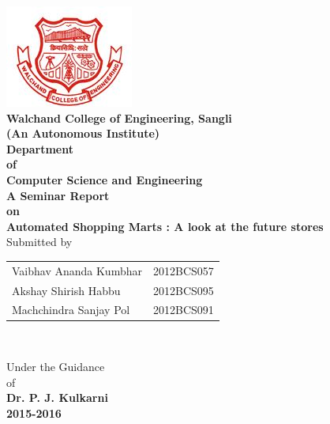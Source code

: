 \documentclass[a4paper,oneside,11pt,english]{report}
\begin{document}


\begin{titlepage}
	{
		\begin{center}
			\includegraphics[width=.2\linewidth]{logo/walchand.jpg}\\[.5cm]
			\textbf{\LARGE Walchand College of Engineering, Sangli }\\
			\textbf {(An Autonomous Institute)}\\[.5cm]
			\textbf {\Large Department\\ of\\ Computer Science and Engineering}\\[1.5cm]
			{ \large \textbf{ A  Seminar Report\\ on} }\\[.5cm]
			\textbf{\Large Automated Shopping Marts : A look at the future stores}\\[2cm]

			\large  {Submitted by}\\[1cm]
			{\setlength{\tabcolsep}{30pt}
				\renewcommand{\arraystretch}{1.5}
				\begin{tabular}{ll}
					\large{Vaibhav Ananda Kumbhar } & \large{2012BCS057} 
					\\
					\large {Akshay Shirish Habbu }&\large{2012BCS095}
					\\
					\large{Machchindra Sanjay Pol} & \large{2012BCS091}
					\\
				\end{tabular}\\[1.5cm]
			}
			\large  {Under the Guidance\\ of}\\[1cm]
			\Large \textbf{ Dr. P. J. Kulkarni  }\\[1cm]
			
			\vfill
			\large \textbf{2015-2016 }\\[.4cm]
		\end{center}
	}
\end{titlepage}
\end{document}
